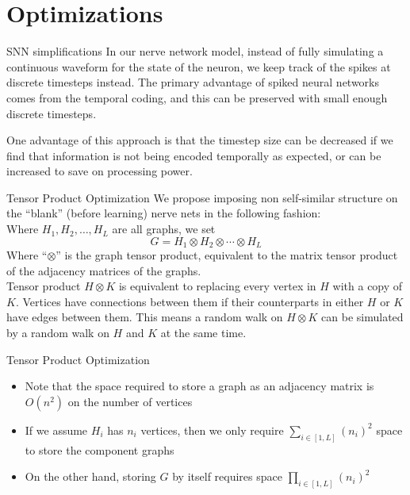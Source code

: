 \documentclass[leqno,presentation,unknownkeysallowed]{beamer}
\begin{document}
\section{Optimizations}

\begin{frame}{SNN simplifications}
In our nerve network model, instead of fully simulating a continuous waveform for the state of the neuron, we keep track of the spikes at discrete timesteps instead. The primary advantage of spiked neural networks comes from the temporal coding, and this can be preserved with small enough discrete timesteps.\newline

One advantage of this approach is that the timestep size can be decreased if we find that information is not being encoded temporally as expected, or can be increased to save on processing power.
\end{frame}

\begin{frame}{Tensor Product Optimization}
We propose imposing non self-similar structure on the ``blank'' (before learning) nerve nets in the following fashion:\\
Where $H_1, H_2, \ldots, H_L$ are all graphs, we set  
$$ G = H_1 \otimes H_2 \otimes \cdots \otimes H_L $$
Where ``$\otimes$'' is the graph tensor product, equivalent to the matrix tensor product of the adjacency matrices of the graphs.\\
Tensor product $H \otimes K$ is equivalent to replacing every vertex in $H$ with a copy of $K$. Vertices have connections between them if their counterparts in either $H$ or $K$ have edges between them. This means a random walk on $H \otimes K$ can be simulated by a random walk on $H$ and $K$ at the same time.
\end{frame}

\begin{frame}{Tensor Product Optimization}
\begin{itemize}
    \item Note that the space required to store a graph as an adjacency matrix is $O(n^2)$ on the number of vertices
    \item If we assume $H_i$ has $n_i$ vertices, then we only require $ \sum_{i \in [1,L]} (n_i)^2 $ space to store the component graphs
    \item On the other hand, storing $G$ by itself requires space $ \prod_{i \in [1,L]} (n_i)^2 $
\end{itemize}
\end{frame}
\end{document}
